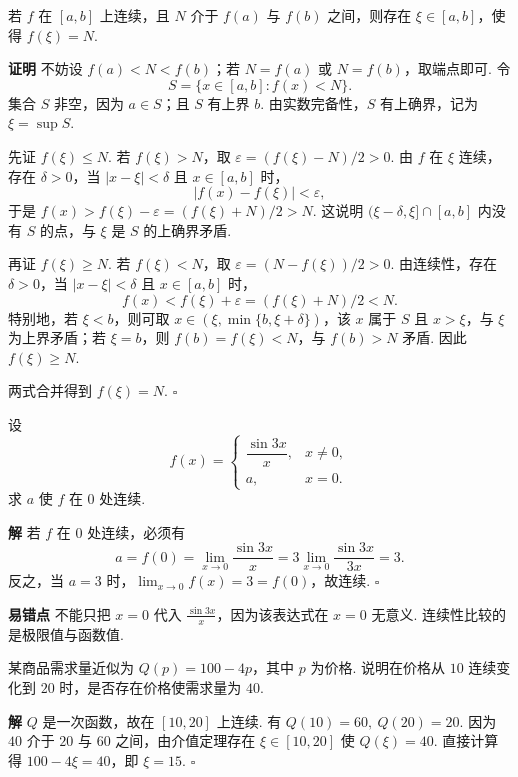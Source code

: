 \documentclass[fontset=fandol]{ctexart}
\newenvironment{proofdetail}{\par\noindent\textbf{证明}\quad}{\hfill$\square$\par\vspace{0.8em}}
\newenvironment{solution}{\par\noindent\textbf{解}\quad}{\hfill$\square$\par\vspace{0.8em}}
\newenvironment{warning}{\par\noindent\textbf{易错点}\quad}{\par\vspace{0.8em}}
\begin{document}
\begin{theorem}[闭区间连续函数的介值定理]
若 $f$ 在 $[a,b]$ 上连续，且 $N$ 介于 $f(a)$ 与 $f(b)$ 之间，则存在 $\xi\in[a,b]$，使得 $f(\xi)=N$.
\end{theorem}
\begin{proofdetail}
不妨设 $f(a)<N<f(b)$；若 $N=f(a)$ 或 $N=f(b)$，取端点即可. 令
\[
S=\{x\in[a,b]: f(x)<N\}.
\]
集合 $S$ 非空，因为 $a\in S$；且 $S$ 有上界 $b$. 由实数完备性，$S$ 有上确界，记为 $\xi=\sup S$.

先证 $f(\xi)\leq N$. 若 $f(\xi)>N$，取 $\varepsilon=(f(\xi)-N)/2>0$. 由 $f$ 在 $\xi$ 连续，存在 $\delta>0$，当 $|x-\xi|<\delta$ 且 $x\in[a,b]$ 时，
\[
|f(x)-f(\xi)|<\varepsilon,
\]
于是 $f(x)>f(\xi)-\varepsilon=(f(\xi)+N)/2>N$. 这说明 $(\xi-\delta,\xi]\cap[a,b]$ 内没有 $S$ 的点，与 $\xi$ 是 $S$ 的上确界矛盾.

再证 $f(\xi)\geq N$. 若 $f(\xi)<N$，取 $\varepsilon=(N-f(\xi))/2>0$. 由连续性，存在 $\delta>0$，当 $|x-\xi|<\delta$ 且 $x\in[a,b]$ 时，
\[
f(x)<f(\xi)+\varepsilon=(f(\xi)+N)/2<N.
\]
特别地，若 $\xi<b$，则可取 $x\in(\xi,\min\{b,\xi+\delta\})$，该 $x$ 属于 $S$ 且 $x>\xi$，与 $\xi$ 为上界矛盾；若 $\xi=b$，则 $f(b)=f(\xi)<N$，与 $f(b)>N$ 矛盾. 因此 $f(\xi)\geq N$.

两式合并得到 $f(\xi)=N$.
\end{proofdetail}

\begin{example}[分段函数连续性]
设
\[
f(x)=
\begin{cases}
\dfrac{\sin 3x}{x},&x\neq0,\\
a,&x=0.
\end{cases}
\]
求 $a$ 使 $f$ 在 $0$ 处连续.
\end{example}
\begin{solution}
若 $f$ 在 $0$ 处连续，必须有
\[
a=f(0)=\lim_{x\to0}\frac{\sin3x}{x}
=3\lim_{x\to0}\frac{\sin3x}{3x}=3.
\]
反之，当 $a=3$ 时，$\lim_{x\to0}f(x)=3=f(0)$，故连续.
\end{solution}
\begin{warning}
不能只把 $x=0$ 代入 $\frac{\sin3x}{x}$，因为该表达式在 $x=0$ 无意义. 连续性比较的是极限值与函数值.
\end{warning}

\begin{example}[需求函数的临界价格]
某商品需求量近似为 $Q(p)=100-4p$，其中 $p$ 为价格. 说明在价格从 $10$ 连续变化到 $20$ 时，是否存在价格使需求量为 $40$.
\end{example}
\begin{solution}
$Q$ 是一次函数，故在 $[10,20]$ 上连续. 有 $Q(10)=60,\ Q(20)=20$. 因为 $40$ 介于 $20$ 与 $60$ 之间，由介值定理存在 $\xi\in[10,20]$ 使 $Q(\xi)=40$. 直接计算得 $100-4\xi=40$，即 $\xi=15$.
\end{solution}
\end{document}
